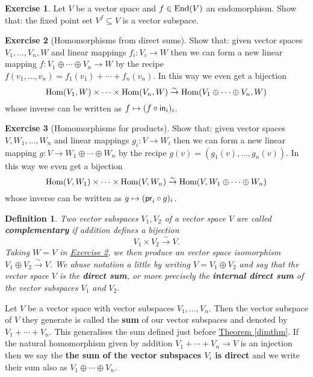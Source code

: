 \documentclass[11pt]{amsbook}
\newtheorem{definition}[theorem]{Definition}
\theoremstyle{definition}
\newtheorem{exercise}{Exercise}
\begin{document}
\begin{exercise} \label{fixerex} Let $V$ be a vector space and $f\in {\rm End}(V)$ an endomorphism. Show that: the fixed point set $V^f \subseteq V$ is a vector subspace.\end{exercise}

\begin{exercise}[Homomorphisms from direct sums] \label{dirsumhom} Show that: given vector spaces $V_1, \ldots ,V_n, W$ and linear mappings $f_i : V_i \to W$ then we can form a new linear mapping $f: V_1 \oplus \cdots \oplus V_n \to W$ by the recipe $f(v_1, \ldots , v_n)  = f_1(v_1) + \cdots + f_n(v_n)$. In this way we even get a bijection $${\rm Hom}(V_1, W) \times \cdots \times {\rm Hom}(V_n, W) \stackrel{\sim}{\to} {\rm Hom}(V_1 \oplus \cdots \oplus V_n, W)$$ whose inverse can be written as $f\mapsto (f\circ {\sf in}_i)_i$.
\end{exercise}

\begin{exercise}[Homomorphisms for products] Show that: given vector spaces $V, W_1, \ldots , W_n$ and linear mappings $g_i: V\to W_i$ then we can form a new linear mapping $g: V\to W_1 \oplus \cdots \oplus W_n$ by the recipe $g(v) = (g_1(v), \ldots , g_n(v))$. In this way we even get a bijection $${\rm Hom}(V, W_1) \times \cdots \times {\rm Hom}(V, W_n) \stackrel{\sim}{\to}  {\rm Hom}(V, W_1 \oplus \cdots \oplus W_n) $$ whose inverse can be written as $g\mapsto ({\sf pr}_i \circ g)_i$.
\end{exercise}

\begin{definition}\label{internaldirsum} Two vector subspaces $V_1, V_2$ of a vector space $V$ are called {\bf complementary} if addition defines a bijection $$V_1\times V_2 \stackrel{\sim}{\to} V.$$ Taking $W = V$ in \hyperref[dirsumhom]{Exercise \ref{dirsumhom}}, we then produce an vector space isomorphism $V_1\oplus V_2 \stackrel{\sim}{\to} V$. We abuse notation a little by writing $V = V_1 \oplus V_2$ and say that the vector space $V$ is the {\bf direct sum}, or more precisely the {\bf internal direct sum} of the vector subspaces $V_1$ and $V_2$.
\end{definition}

Let $V$ be a vector space with vector subspaces $V_1, \ldots , V_n$. Then the vector subspace of $V$ they generate is called the {\bf sum} of our vector subspaces and denoted by $V_1 + \cdots + V_n$. This generalises the sum defined just before \hyperref[dimthm]{Theorem \ref{dimthm}}. If the natural homomorphism given by addition $V_1 + \cdots + V_n \to V$ is an injection then we say the {\bf the sum of the vector subspaces $V_i$ is direct} and we write their sum also as $V_1\oplus \cdots \oplus V_n$.
\end{document}
